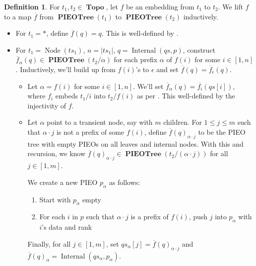 \documentclass{amsart}
\DeclareMathOperator{\Topo}{\mathbf{Topo}}
\DeclareMathOperator{\PIEOTree}{\mathbf{PIEOTree}}
\DeclareMathOperator{\Internal}{\mathrm{Internal}}
\DeclareMathOperator{\Node}{\mathrm{Node}}
\theoremstyle{definition}
\newtheorem{dfn}[thm]{Definition}
\begin{document}
\begin{dfn}
    \label{dfn:f_bar}
    For $t_1, t_2 \in \Topo$, let $f$ be an embedding from $t_1$ to $t_2$.
    We lift $f$ to a map $\overline{f}$ from $\PIEOTree(t_1)$ to $\PIEOTree(t_2)$ inductively.
    \begin{itemize}
        \item For $t_1 = \ast$, define $\overline{f}(q) = q$. This is well-defined by \cite[Lemma ~5.2]{OG}.
        \item For $t_1 = \Node(ts_1)$, $n = |ts_1|$, $q = \Internal(qs, p)$, 
            construct $\overline{f}_{\alpha}(q) \in \PIEOTree(t_2/\alpha)$ for each prefix $\alpha$ of $f(i)$ for some $i \in [1,n]$.
            Inductively, we'll build up from $f(i)$'s to $\epsilon$ and set $\overline{f}(q) = \overline{f}_\epsilon(q)$.
            \begin{itemize}
                \item Let $\alpha = f(i)$ for some $i \in [1,n]$. We'll set $\overline{f}_\alpha(q) = \overline{f_i}(qs[i])$, 
                    where $f_i$ embeds $t_1/i$ into $t_2/f(i)$ as per \cite[Lemma 5.2]{OG}.
                    This well-defined by the injectivity of $f$.
                \item Let $\alpha$ point to a transient node, say with $m$ children.
                    For $1 \leq j \leq m$ such that $\alpha \cdot j$ is not a prefix of some $f(i)$, 
                    define $\overline{f}(q)_{\alpha \cdot j}$ to be the PIEO tree with empty PIEOs on all leaves and internal nodes. 
                    With this and recursion, we know $\overline{f}(q)_{\alpha \cdot j} \in \PIEOTree(t_2/(\alpha \cdot j))$ for all $j \in [1, m]$.

                    We create a new PIEO $p_\alpha$ as follows:
                    \begin{enumerate} 
                        \item Start with $p_\alpha$ empty
                        \item For each $i$ in $p$ such that $\alpha \cdot j$ is a prefix of $f(i)$, push $j$ into $p_\alpha$ with $i$'s data and rank
                    \end{enumerate}

                    Finally, for all $j \in [1,m]$, set $qs_\alpha[j] = \overline{f}(q)_{\alpha \cdot j}$ and $\overline{f}(q)_\alpha = \Internal(qs_\alpha, p_\alpha)$.
            \end{itemize}
    \end{itemize}
\end{dfn}
\end{document}
